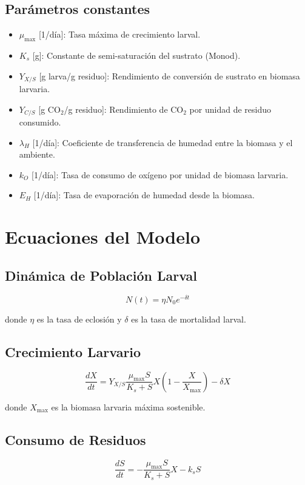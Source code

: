\documentclass{article}
\begin{document}
\subsection{Parámetros constantes}
\begin{itemize}
    \item $\mu_{\max}$ [1/día]: Tasa máxima de crecimiento larval.
    \item $K_s$ [g]: Constante de semi-saturación del sustrato (Monod).
    \item $Y_{X/S}$ [g larva/g residuo]: Rendimiento de conversión de sustrato en biomasa larvaria.
    \item $Y_{C/S}$ [g CO$_2$/g residuo]: Rendimiento de CO$_2$ por unidad de residuo consumido.
    \item $\lambda_H$ [1/día]: Coeficiente de transferencia de humedad entre la biomasa y el ambiente.
    \item $k_O$ [1/día]: Tasa de consumo de oxígeno por unidad de biomasa larvaria.
    \item $E_H$ [1/día]: Tasa de evaporación de humedad desde la biomasa.
\end{itemize}

\section{Ecuaciones del Modelo}
\subsection{Dinámica de Población Larval}
\begin{equation}
    N(t) = \eta N_0 e^{-\delta t}
\end{equation}

donde $\eta$ es la tasa de eclosión y $\delta$ es la tasa de mortalidad larval.

\subsection{Crecimiento Larvario}
\begin{equation}
    \frac{dX}{dt} = Y_{X/S} \frac{\mu_{\max} S}{K_s + S} X \left( 1 - \frac{X}{X_{\max}} \right) - \delta X
\end{equation}

donde $X_{\max}$ es la biomasa larvaria máxima sostenible.

\subsection{Consumo de Residuos}
\begin{equation}
    \frac{dS}{dt} = -\frac{\mu_{\max} S}{K_s + S} X - k_s S
\end{equation}
\end{document}
